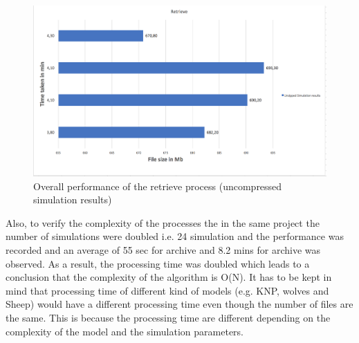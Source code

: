 \begin{figure}[H]
    \centering \includegraphics[scale=0.5]{grafiken/retrieveUnzip.png}
    \caption{Overall performance of the retrieve process (uncompressed simulation results)}
    \label{fig:restorePerformanceUn}
\end{figure}

Also, to verify the complexity of the processes the in the same project the number of simulations were doubled i.e. 24 simulation and the performance was recorded
and an average of 55 sec for archive and 8.2 mins for archive was observed. As a result, the processing time was doubled which leads to a
conclusion that the complexity of the algorithm is O(N). It has to be kept in mind that processing time of different kind of models (e.g. KNP, wolves and Sheep) 
would have a different processing time even though the number of files are the same. This is because the processing time are different depending on the complexity of 
the model and the simulation parameters. 